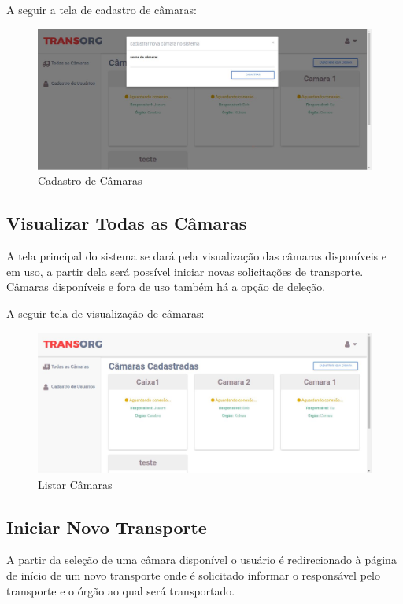 	A seguir a tela de cadastro de câmaras:

\begin{figure}[H]
\centering
\includegraphics[width=16cm]{figuras/cadastroCamaras_software.JPG}
\caption{Cadastro de Câmaras}
\end{figure}

\subsection{Visualizar Todas as Câmaras}
	A tela principal do sistema se dará pela visualização das câmaras disponíveis e em uso, a partir dela será possível iniciar novas solicitações de transporte. Câmaras disponíveis e fora de uso também há a opção de deleção.
	
	A seguir tela de visualização de câmaras:

\begin{figure}[H]
\centering
\includegraphics[width=16cm]{figuras/listaCamaras_software.JPG}
\caption{Listar Câmaras}
\end{figure}

\subsection{Iniciar Novo Transporte}
	A partir da seleção de uma câmara disponível o usuário é redirecionado à página de início de um novo transporte onde é solicitado informar o responsável pelo transporte e o órgão ao qual será transportado.
	
